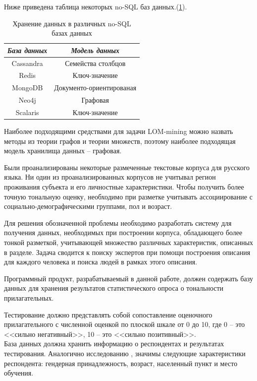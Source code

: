 Ниже приведена таблица некоторых no-SQL баз данных.(\ref{tab:nosql-store}). 
\begin{table}[H]
	\centering
	\caption{Хранение данных в различных no-SQL базах данных}
	\renewcommand{\arraystretch}{1.5}
	\begin{tabular}{||c|c||}
		\hline
		\textit{База данных} & \textit{Модель данных} \\ \hline
		Cassandra & Семейства столбцов \\ \hline
		Redis & Ключ-значение \\ \hline
		MongoDB & Документо-ориентированая \\ \hline
		Neo4j & Графовая \\ \hline
		Scalaris & Ключ-значение \\ \hline
	\end{tabular}
	\label{tab:nosql-store}
\end{table}
Наиболее подходящими средствами для задачи LOM-mining можно назвать
методы из теории графов и теории множеств, \cite{Попов2004} поэтому наиболее подходящая модель хранилища данных -- графовая. 

Были проанализированы некоторые размеченные текстовые корпуса для русского языка. Ни один из проанализированных корпусов не учитывал регион проживания субъекта и его личностные характеристики. Чтобы получить более точную тональную оценку, необходимо при разметке учитывать ассоциирование с социально-демографическими группами, пол и возраст.

Для решения обозначенной проблемы необходимо разработать систему для получения данных, необходимых при построении корпуса, обладающего более тонкой разметкой, учитывающей множество различных характеристик, описанных в разделе. Задача сводится к поиску экспертов при помощи построения описания для каждого человека и поиска людей в рамках этого описания. 

Программный продукт, разрабатываемый в данной работе, должен содержать базу данных для хранения результатов статистического опроса о тональности прилагательных. 

Тестирование должно представлять собой  сопоставление оценочного прилагательного с численной оценкой по плоской шкале от 0 до 10, где 0 -- это <<сильно негативный>>, 10 -- это <<сильно позитивный>>. \\
База данных должна хранить информацию о респондентах и результатах тестирования. Аналогично исследованию \cite{goodisgood}, значимы следующие характеристики респондента: гендерная принадлежность, возраст, населенный  пункт и место обучения. 
